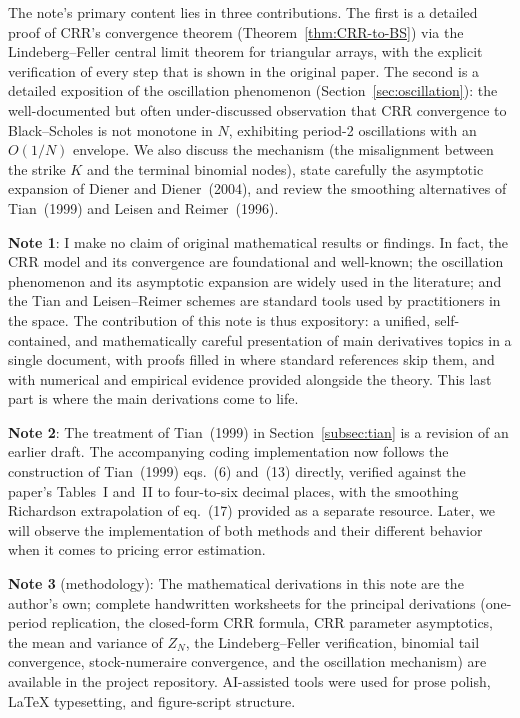 \documentclass[11pt,a4paper]{article}
\newif\ifincludenumerics
\newif\ifincludeempirical
\theoremstyle{plain}
\theoremstyle{definition}
\begin{document}
The note's primary content lies in three contributions. The first is a
detailed proof of CRR's convergence theorem
(Theorem~\ref{thm:CRR-to-BS}) via the Lindeberg--Feller central limit
theorem for triangular arrays, with the explicit verification of every
step that is shown in the original paper. The second is a detailed
exposition of the oscillation phenomenon (Section~\ref{sec:oscillation}): the well-documented but often under-discussed observation that CRR convergence to Black--Scholes is not monotone in $N$, exhibiting period-2 oscillations with an $O(1/N)$
envelope. We also discuss the mechanism (the misalignment between the
strike $K$ and the terminal binomial nodes), state carefully the 
asymptotic expansion of Diener and Diener~(2004), and review the
smoothing alternatives of Tian~(1999) and Leisen and
Reimer~(1996). \ifincludenumerics
\ifincludeempirical
The third is a numerical implementation and an
empirical calibration study using historical S\&P~500 index option
data from OptionMetrics, presented in
Sections~\ref{sec:numerics} and~\ref{sec:empirical}.
\fi
\fi

\textbf{Note 1}: I make no claim of original mathematical results or findings. In fact, the CRR model and
its convergence are foundational and well-known; the oscillation
phenomenon and its asymptotic expansion are widely used in the
literature; and the Tian and Leisen--Reimer schemes are standard tools used by practitioners in the space. 
The contribution of this note is thus expository: a unified, self-contained, and mathematically careful presentation of main derivatives topics in a single document, with proofs filled in where standard references skip them, and with numerical and empirical evidence provided alongside the theory. This last part is where the main derivations come to life.

\textbf{Note 2}: The treatment of Tian~(1999) in Section~\ref{subsec:tian} is a
revision of an earlier draft. The accompanying coding implementation now
follows the construction of Tian~(1999) eqs.~(6) and~(13) directly,
verified against the paper's Tables~I and~II to four-to-six decimal
places, with the smoothing Richardson extrapolation of
eq.~(17) provided as a separate resource. Later, we will observe the implementation of both methods and their different behavior when it comes to pricing error estimation.

\textbf{Note 3} (methodology): The mathematical derivations in this note are the author's own; complete handwritten worksheets for the principal derivations (one-period replication, the closed-form CRR formula, CRR parameter asymptotics, the mean and variance of $Z_N$, the Lindeberg--Feller verification, binomial tail convergence, stock-numeraire convergence, and the oscillation mechanism) are available in the project repository. AI-assisted tools were used for prose polish, LaTeX typesetting, and figure-script structure.
\end{document}
